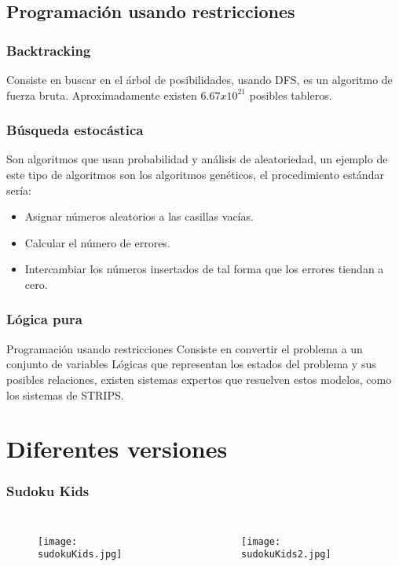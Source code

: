 \documentclass{beamer}
\begin{document}
\subsection{Programación usando restricciones}
\begin{frame}
\frametitle{Backtracking}
\begin{block}{}
Consiste en buscar en el árbol de posibilidades, usando DFS, es un algoritmo de fuerza bruta.
Aproximadamente existen $6.67 x 10^{21}$  posibles tableros.
\end{block}
\end{frame}

\begin{frame}
\frametitle{Búsqueda estocástica}
\begin{block}{}
Son algoritmos que usan probabilidad y análisis de aleatoriedad, un ejemplo de este tipo de algoritmos son los algoritmos genéticos, el procedimiento estándar sería:
\begin{itemize}
\item
Asignar números aleatorios a las casillas vacías.
\item 
Calcular el número de errores.
\item
Intercambiar los números insertados de tal forma que los errores tiendan a cero.
\end{itemize}
\end{block}
\end{frame}


\begin{frame}
\frametitle{Lógica pura}
\begin{block}{Programación usando restricciones}
Consiste en convertir el problema a un conjunto de variables Lógicas que representan los estados del problema y sus posibles relaciones, existen sistemas expertos que resuelven estos modelos, como los sistemas de STRIPS.
\end{block}
\end{frame}

\section{Diferentes versiones}

\begin{frame}
\frametitle{Sudoku Kids}
\begin{columns}[c] %

\begin{figure}[H]
  \centering
  \texttt{[image: sudokuKids.jpg]}
\end{figure}

\begin{figure}[H]
  \centering
  \texttt{[image: sudokuKids2.jpg]}
\end{figure}
\end{columns}
\end{frame}
\end{document}
